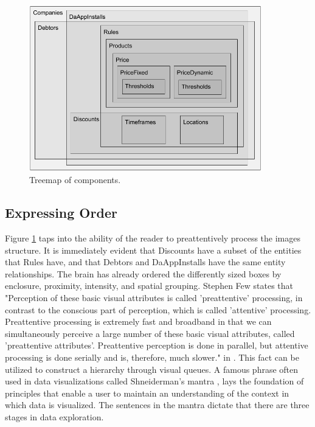 \begin{figure}[H]
	\centering
	\includegraphics[width=0.9\textwidth]{Treemap}
	\caption[Treemap of Components]{Treemap of components.}
	\label{fig:Treemap}
\end{figure}

\subsection{Expressing Order}
Figure \ref{fig:Treemap} taps into the ability of the reader to preattentively process the images structure. It is immediately evident that Discounts have a subset of the entities that Rules have, and that Debtors and DaAppInstalls have the same entity relationships. The brain has already ordered the differently sized boxes by enclosure, proximity, intensity, and spatial grouping. Stephen Few states that "Perception of these basic visual attributes is called 'preattentive' processing, in contrast to the conscious part of perception, which is called 'attentive' processing. Preattentive processing is extremely fast and broadband in that we can simultaneously perceive a large number of these basic visual attributes, called 'preattentive attributes'. Preattentive perception is done in parallel, but attentive processing is done serially and is, therefore, much slower." in \cite[p.~3]{few}. This fact can be utilized to construct a hierarchy through visual queues. A famous phrase often used in data visualizations called Shneiderman's mantra \cite{mantra}, lays the foundation of principles that enable a user to maintain an understanding of the context in which data is visualized. The sentences in the mantra dictate that there are three stages in data exploration.

